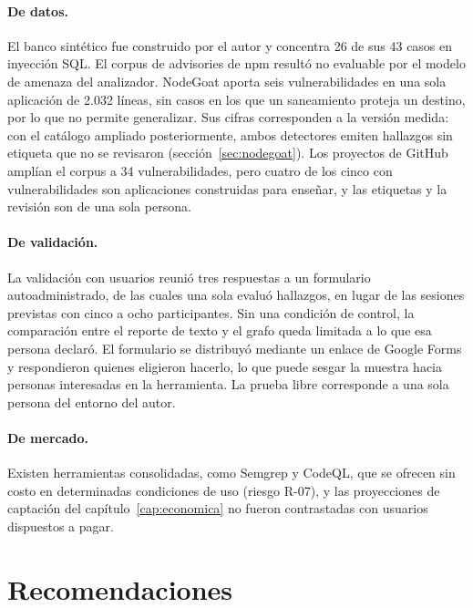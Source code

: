 \paragraph{De datos.} El banco sintético fue construido por el autor y
concentra 26 de sus 43 casos en inyección SQL. El corpus de advisories
de npm resultó no evaluable por el modelo de amenaza del analizador.
NodeGoat aporta seis vulnerabilidades en una sola aplicación de 2.032
líneas, sin casos en los que un saneamiento proteja un destino, por lo
que no permite generalizar. Sus cifras corresponden a la versión medida:
con el catálogo ampliado posteriormente, ambos detectores emiten
hallazgos sin etiqueta que no se revisaron
(sección~\ref{sec:nodegoat}). Los proyectos de GitHub amplían el corpus a
34 vulnerabilidades, pero cuatro de los cinco con vulnerabilidades son
aplicaciones construidas para enseñar, y las etiquetas y la revisión son
de una sola persona.

\paragraph{De validación.} La validación con usuarios reunió tres
respuestas a un formulario autoadministrado, de las cuales una sola
evaluó hallazgos, en lugar de las sesiones previstas con cinco a ocho
participantes. Sin una condición de control, la comparación entre el
reporte de texto y el grafo queda limitada a lo que esa persona declaró.
El formulario se distribuyó mediante un enlace de Google Forms y
respondieron quienes eligieron hacerlo, lo que puede sesgar la muestra
hacia personas interesadas en la herramienta. La prueba libre corresponde a una
sola persona del entorno del autor.

\paragraph{De mercado.} Existen herramientas consolidadas, como Semgrep
y CodeQL, que se ofrecen sin costo en determinadas condiciones de uso
(riesgo R-07), y las proyecciones de captación del
capítulo~\ref{cap:economica} no fueron contrastadas con usuarios
dispuestos a pagar.

\section{Recomendaciones}\label{sec:recomendaciones}

